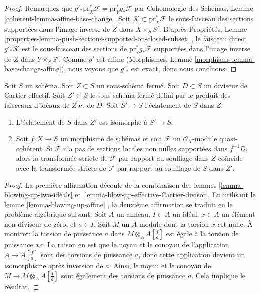 \begin{proof}
Remarquez que  $g'_*\text{pr}_X^*\mathcal{F} = \text{pr}_Y^*g_*\mathcal{F}$  par Cohomologie des Schémas, Lemme  \ref{coherent-lemma-affine-base-change}. Soit
 $\mathcal{K} \subset \text{pr}_X^*\mathcal{F}$  le sous-faisceau des sections supportées dans l'image inverse de
 $Z$  dans  $X \times_S S'$. D'après Propriétés, Lemme  \ref{properties-lemma-push-sections-supported-on-closed-subset} , le
faisceau direct  $g'_*\mathcal{K}$  est le sous-faisceau des sections de  $\text{pr}_Y^*g_*\mathcal{F}$ 
supportées dans l'image inverse de  $Z$  dans  $Y \times_S S'$. Comme
 $g'$  est affine (Morphismes, Lemme  \ref{morphisms-lemma-base-change-affine}), nous voyons que
 $g'_*$  est exact, donc nous concluons.
\end{proof}

\begin{lemma}
\label{lemma-strict-transform-different-centers}
Soit  $S$  un schéma. Soit  $Z \subset S$  un sous-schéma fermé. Soit
 $D \subset S$  un diviseur de Cartier effectif. Soit  $Z' \subset S$  le sous-schéma
fermé défini par le produit des faisceaux d'idéaux de  $Z$  et de
 $D$. Soit  $S' \to S$  l'éclatement de  $S$  dans  $Z$.
\begin{enumerate}
\item L'éclatement de  $S$  dans  $Z'$  est isomorphe à  $S' \to S$.
\item Soit  $f : X \to S$  un morphisme de schémas et soit  $\mathcal{F}$  un
 $\mathcal{O}_X$-module quasi-cohérent. Si  $\mathcal{F}$  n'a pas de sections locales
non nulles supportées dans  $f^{-1}D$, alors la transformée stricte de
 $\mathcal{F}$  par rapport au soufflage dans  $Z$  coïncide avec la
transformée stricte de  $\mathcal{F}$  par rapport au soufflage de  $S$  dans
 $Z'$.
\end{enumerate}
\end{lemma}

\begin{proof}
La première affirmation découle de la combinaison des lemmes  \ref{lemma-blowing-up-two-ideals}  et
 \ref{lemma-blow-up-effective-Cartier-divisor}. En utilisant le lemme  \ref{lemma-blowing-up-affine} , la deuxième affirmation se
traduit en le problème algébrique suivant. Soit  $A$  un anneau,
 $I \subset A$  un idéal,  $x \in A$  un élément non diviseur de zéro, et
 $a \in I$. Soit  $M$  un  $A$-module dont la torsion
 $x$ est nulle. À montrer: la torsion de puissance  $a$ dans
 $M \otimes_A A[\frac{I}{a}]$  est égale à la torsion de puissance  $xa$. La raison en est
que le noyau et le conoyau de l'application  $A \to A[\frac{I}{a}]$  sont des torsions de
puissance  $a$, donc cette application devient un isomorphisme après
inversion de  $a$. Ainsi, le noyau et le conoyau de  $M \to M \otimes_A A[\frac{I}{a}]$  sont
également des torsions de puissance  $a$. Cela implique le résultat.
\end{proof}

